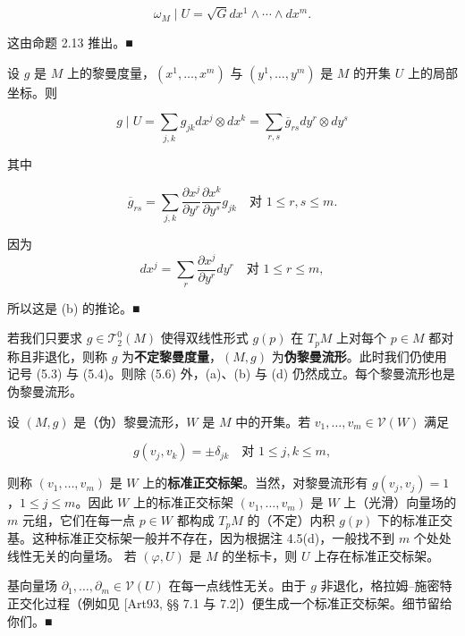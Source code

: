 \begin{remark}
\begin{items}
\[
\omega_{M} \mid U = \sqrt{G} dx^{1} \wedge \cdots \wedge dx^{m} .
\]

\proofhead
这由命题 2.13 推出。\nobreak\hspace{0.35em}■
\item

设 $ g $ 是 $ M $ 上的黎曼度量，$ (x^{1}, \ldots, x^{m}) $ 与 $ (y^{1}, \ldots, y^{m}) $ 是 $ M $ 的开集 $ U $ 上的局部坐标。则

\[
g \mid U = \sum_{j,k} g_{jk} dx^{j} \otimes dx^{k} = \sum_{r,s} \overline{g}_{rs} dy^{r} \otimes dy^{s}
\]

其中

\[
\overline{g}_{rs} = \sum_{j,k} \frac{\partial x^{j}}{\partial y^{r}} \frac{\partial x^{k}}{\partial y^{s}} g_{jk} \quad \text{对 } 1 \le r, s \le m .
\]

\proofhead
因为
\[
dx^{j} = \sum_{r} \frac{\partial x^{j}}{\partial y^{r}} dy^{r} \quad \text{对 } 1 \le r \le m ,
\]

所以这是 (b) 的推论。\nobreak\hspace{0.35em}■

\item

若我们只要求 $ g \in \mathcal{T}^{0}_{2}(M) $ 使得双线性形式 $ g(p) $ 在 $ T_{p}M $ 上对每个 $ p \in M $ 都对称且非退化，则称 $ g $ 为\textbf{不定黎曼度量}，$ (M, g) $ 为\textbf{伪黎曼流形}。此时我们仍使用记号 (5.3) 与 (5.4)。则除 (5.6) 外，(a)、(b) 与 (d) 仍然成立。每个黎曼流形也是伪黎曼流形。

\item

设 $ (M, g) $ 是（伪）黎曼流形，$ W $ 是 $ M $ 中的开集。若 $ v_{1}, \ldots, v_{m} \in \mathcal{V}(W) $ 满足

\[
g(v_{j}, v_{k}) = \pm\delta_{jk} \quad \text{对 } 1 \le j, k \le m ,
\]

则称 $ (v_{1}, \ldots, v_{m}) $ 是 $ W $ 上的\textbf{标准正交标架}。当然，对黎曼流形有 $ g(v_{j}, v_{j}) = 1 $，$ 1 \le j \le m $。因此 $ W $ 上的标准正交标架 $ (v_{1}, \ldots, v_{m}) $ 是 $ W $ 上（光滑）向量场的 $ m $ 元组，它们在每一点 $ p \in W $ 都构成 $ T_{p}M $ 的（不定）内积 $ g(p) $ 下的标准正交基。这种标准正交标架一般并不存在，因为根据注 4.5(d)，一般找不到 $ m $ 个处处线性无关的向量场。
若 $ (\varphi, U) $ 是 $ M $ 的坐标卡，则 $ U $ 上存在标准正交标架。

\proofhead
基向量场 $ \partial_{1}, \ldots, \partial_{m} \in \mathcal{V}(U) $ 在每一点线性无关。由于 $ g $ 非退化，格拉姆–施密特正交化过程（例如见 [Art93, §§ 7.1 与 7.2]）便生成一个标准正交标架。细节留给你们。\nobreak\hspace{0.35em}■
\item


\end{items}
\end{remark}
